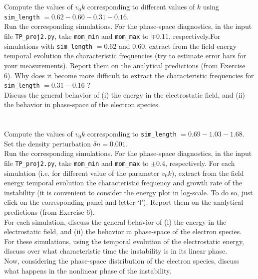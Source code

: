 \documentclass[11pt,a4paper]{article}
\begin{document}
$ $\\
\\
 Compute the values of $v_0 k$ corresponding to different values of $k$ using \\ \texttt{sim\_length} $= 0.62 - 0.60- 0.31 - 0.16$.\\
 Run the corresponding simulations.  For the phase-space diagnostics, in the input file \texttt{TP\_proj2.py}, take \texttt{mom\_min} and \texttt{mom\_max} to $\mp 0.11$, respectively.For simulations with \texttt{sim\_length} $= 0.62$ and $0.60$, extract from the field energy temporal evolution the characteristic frequencies (try to estimate error bars for your measurements). Report them on the analytical predictions (from Exercise 6). Why does it become more difficult to extract the characteristic frequencies for \texttt{sim\_length} $= 0.31 - 0.16$ ?\\
 Discuss the general behavior of (i) the energy in the electrostatic field, and (ii) the behavior in phase-space of the electron species. \\

$ $\\
\\
  Compute the values of $v_0 k$ corresponding to \texttt{sim\_length} $= 0.69 - 1.03 - 1.68$. Set the density perturbation $\delta n = 0.001$. \\
 Run the corresponding simulations. For the phase-space diagnostics, in the input file \texttt{TP\_proj2.py}, take \texttt{mom\_min} and \texttt{mom\_max} to $\pm 0.4$, respectively. For each simulation (i.e. for different value of the parameter $v_0 k$), extract from the field energy temporal evolution the characteristic frequency and growth rate of the instability (it is convenient to consider the energy plot in log-scale. To do so, just click on the corresponding panel and letter `l'). Report them on the analytical predictions (from Exercise 6).\\
 For each simulation, discuss the general behavior of (i) the energy in the electrostatic field, and (ii) the behavior in phase-space of the electron species. \\
 For these simulations, using the temporal evolution of the electrostatic energy, discuss over what characteristic time the instability is in its linear phase.\\
 Now, considering the phase-space distribution of the electron species, discuss what happens in the nonlinear phase of the instability.
\end{document}

